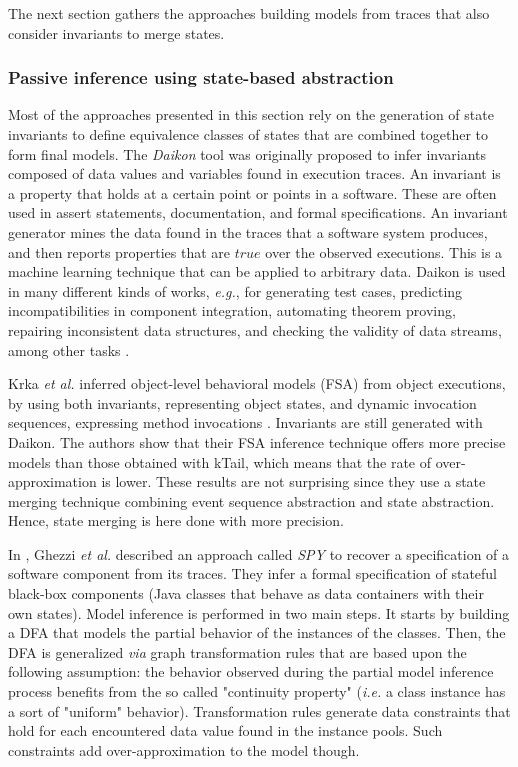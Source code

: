 The next section gathers the approaches building models from
traces that also consider invariants to merge states.

\subsubsection{Passive inference using state-based abstraction}
\label{sec:passive-spec}

Most of the approaches presented in this section rely on the generation
of state invariants to define equivalence classes of states that
are combined together to form final models. The \textit{Daikon}
tool \cite{Ernst:1999:DDL:302405.302467} was originally proposed
to infer invariants composed of data values and variables found
in execution traces. An invariant is a property that holds at a
certain point or points in a software. These are often used in
assert statements, documentation, and formal specifications. An
invariant generator mines the data found in the traces that a
software system produces, and then reports properties that are
$true$ over the observed executions.  This is a machine learning
technique that can be applied to arbitrary data. Daikon is used
in many different kinds of works, \emph{e.g.}, for generating test cases,
predicting incompatibilities in component integration, automating
theorem proving, repairing inconsistent data structures, and
checking the validity of data streams, among other tasks
\cite{Ernst200735}.

Krka \emph{et al.} inferred object-level behavioral models (FSA) from
object executions, by using both invariants, representing object
states, and dynamic invocation sequences, expressing method
invocations \cite{Krka:2010:UDE:1810295.1810324}.
Invariants are still generated with Daikon. The authors show that
their FSA inference technique offers more precise models than
those obtained with kTail, which means that the rate of
over-approximation is lower. These results are not surprising
since they use a state merging technique combining event sequence
abstraction and state abstraction. Hence, state merging is here
done with more precision.

In \cite{Ghezzi:2009:SIB:1555001.1555057}, Ghezzi \emph{et al.}
described an approach called \textit{SPY} to recover a
specification of a software component from its traces. They infer
a formal specification of stateful black-box components (Java
classes that behave as data containers with their own states).
Model inference is performed in two main steps. It starts by
building a DFA that models the partial behavior of the instances
of the classes. Then, the DFA is generalized \emph{via} graph
transformation rules that are based upon the following
assumption: the behavior observed during the partial model
inference process benefits from the so called "continuity
property" (\emph{i.e.} a class instance has a sort of "uniform"
behavior). Transformation rules generate data constraints that
hold for each encountered data value found in the instance pools.
Such constraints add over-approximation to the model though.

